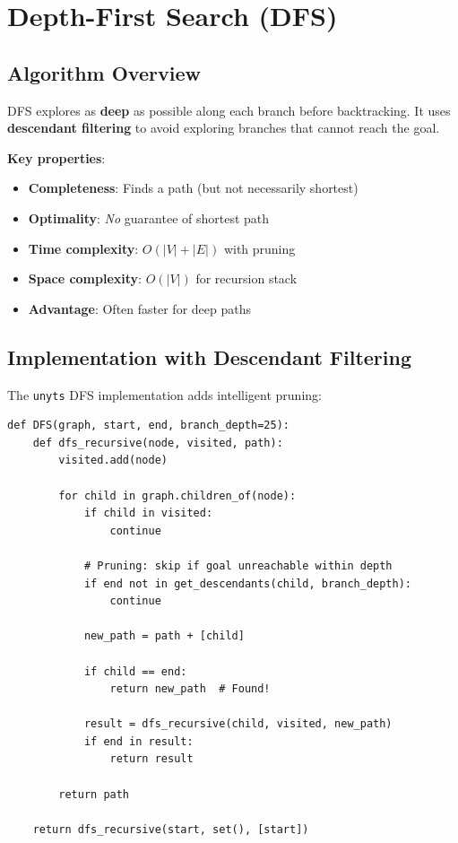 \documentclass[11pt,a4paper]{report}
\begin{document}
\section{Depth-First Search (DFS)}

\subsection{Algorithm Overview}

DFS explores as \textbf{deep} as possible along each branch before backtracking. It uses \textbf{descendant filtering} to avoid exploring branches that cannot reach the goal.

\textbf{Key properties}:
\begin{itemize}[leftmargin=*]
  \item \textbf{Completeness}: Finds a path (but not necessarily shortest)
  \item \textbf{Optimality}: \emph{No} guarantee of shortest path
  \item \textbf{Time complexity}: $O(|V| + |E|)$ with pruning
  \item \textbf{Space complexity}: $O(|V|)$ for recursion stack
  \item \textbf{Advantage}: Often faster for deep paths
\end{itemize}

\subsection{Implementation with Descendant Filtering}

The \texttt{unyts} DFS implementation adds intelligent pruning:

\begin{lstlisting}[style=pythonstyle, caption={DFS with descendant filtering}]
def DFS(graph, start, end, branch_depth=25):
    def dfs_recursive(node, visited, path):
        visited.add(node)
        
        for child in graph.children_of(node):
            if child in visited:
                continue
            
            # Pruning: skip if goal unreachable within depth
            if end not in get_descendants(child, branch_depth):
                continue
            
            new_path = path + [child]
            
            if child == end:
                return new_path  # Found!
            
            result = dfs_recursive(child, visited, new_path)
            if end in result:
                return result
        
        return path
    
    return dfs_recursive(start, set(), [start])
\end{lstlisting}
\end{document}
